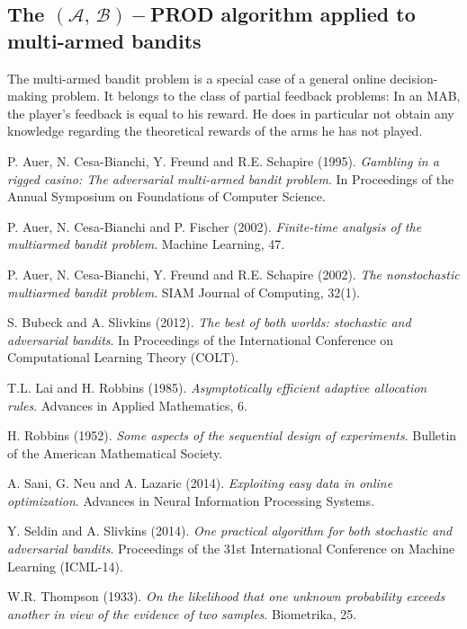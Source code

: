 \documentclass[11pt]{article}
\begin{document}
\subsection*{The $(\mathcal{A},\, \mathcal{B})-$PROD algorithm applied to multi-armed bandits}

The multi-armed bandit problem is a special case of a general online decision-making problem. It belongs to the class of partial feedback problems: In an MAB, the player's feedback is equal to his reward. He does in particular not obtain any knowledge regarding the theoretical rewards of the arms he has not played.

\pagebreak

\begin{thebibliography}{1}

 P. Auer, N. Cesa-Bianchi, Y. Freund and R.E. Schapire (1995). {\em Gambling in a rigged casino: The adversarial multi-armed bandit problem}. In Proceedings of the Annual Symposium on Foundations of Computer Science.

 P. Auer, N. Cesa-Bianchi and P. Fischer (2002). {\em Finite-time analysis of the multiarmed bandit problem}. Machine Learning, 47.

 P. Auer, N. Cesa-Bianchi, Y. Freund and R.E. Schapire (2002). {\em The nonstochastic multiarmed bandit problem}. SIAM Journal of Computing, 32(1).

 S. Bubeck and A. Slivkins (2012). {\em The best of both worlds: stochastic and adversarial bandits}. In Proceedings of the International Conference on Computational Learning Theory (COLT).

 T.L. Lai and H. Robbins (1985). {\em Asymptotically efficient adaptive allocation rules}. Advances in Applied Mathematics, 6.

 H. Robbins (1952). {\em Some aspects of the sequential design of experiments}.  Bulletin of the American Mathematical Society.

 A. Sani, G. Neu and A. Lazaric (2014). {\em Exploiting easy data in online optimization}.  Advances in Neural Information Processing Systems.

 Y. Seldin and A. Slivkins (2014). {\em One practical algorithm for both stochastic and adversarial bandits}.  Proceedings of the 31st International Conference on Machine Learning (ICML-14).

 W.R. Thompson (1933). {\em On the likelihood that one unknown probability exceeds another in view of the evidence of two samples}. Biometrika, 25.

\end{thebibliography}
\end{document}
